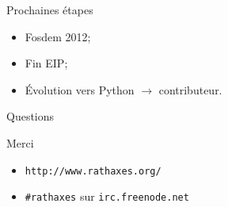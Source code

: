 \documentclass[xcolor={usenames,svgnames}]{beamer}
\begin{document}
\begin{frame}{Prochaines étapes}
	\begin{center}
        \Large{%
	\begin{itemize}
		\item	Fosdem 2012;
		\item	Fin EIP;
		\item	Évolution vers Python $\rightarrow$ contributeur.
	\end{itemize}
        }
	\end{center}
\end{frame}

\begin{frame}{Questions}
\begin{center}
\Huge{Merci}

\end{center}

\vspace{2em}
\begin{itemize}
\item \Large{\texttt{http://www.rathaxes.org/}}
\item \Large{\texttt{\#rathaxes} sur \texttt{irc.freenode.net}}
\end{itemize}
\end{frame}
\end{document}
